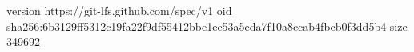 version https://git-lfs.github.com/spec/v1
oid sha256:6b3129ff5312c19fa22f9df55412bbe1ee53a5eda7f10a8ccab4fbcb0f3dd5b4
size 349692
